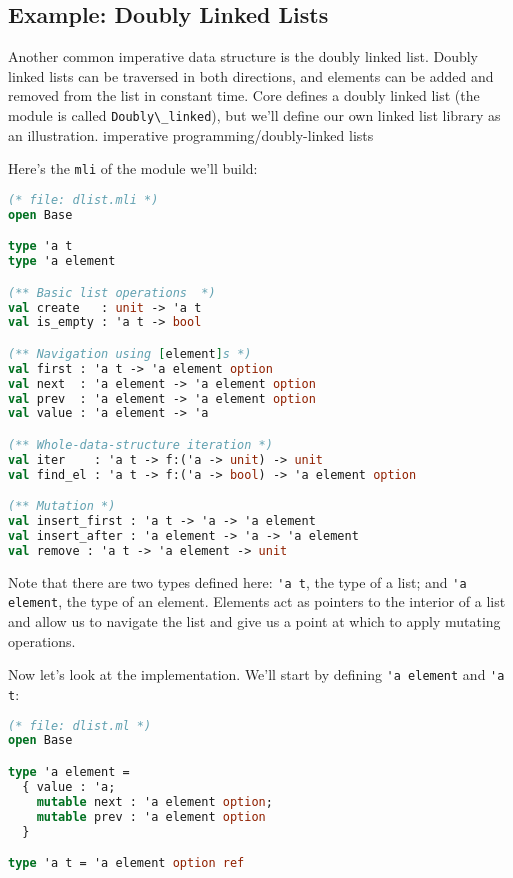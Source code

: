 \hypertarget{example-doubly-linked-lists}{%
\subsection{Example: Doubly Linked
Lists}\label{example-doubly-linked-lists}}

Another common imperative data structure is the doubly linked list.
Doubly linked lists can be traversed in both directions, and elements
can be added and removed from the list in constant time. Core defines a
doubly linked list (the module is called
\passthrough{\lstinline!Doubly\_linked!}), but we'll define our own
linked list library as an illustration.
\protect\hypertarget{IPdoublink}{}{imperative
programming/doubly-linked lists}

Here's the \passthrough{\lstinline!mli!} of the module we'll build:

\begin{lstlisting}[language=Caml]
(* file: dlist.mli *)
open Base

type 'a t
type 'a element

(** Basic list operations  *)
val create   : unit -> 'a t
val is_empty : 'a t -> bool

(** Navigation using [element]s *)
val first : 'a t -> 'a element option
val next  : 'a element -> 'a element option
val prev  : 'a element -> 'a element option
val value : 'a element -> 'a

(** Whole-data-structure iteration *)
val iter    : 'a t -> f:('a -> unit) -> unit
val find_el : 'a t -> f:('a -> bool) -> 'a element option

(** Mutation *)
val insert_first : 'a t -> 'a -> 'a element
val insert_after : 'a element -> 'a -> 'a element
val remove : 'a t -> 'a element -> unit
\end{lstlisting}

Note that there are two types defined here:
\passthrough{\lstinline!'a t!}, the type of a list; and
\passthrough{\lstinline!'a element!}, the type of an element. Elements
act as pointers to the interior of a list and allow us to navigate the
list and give us a point at which to apply mutating operations.

Now let's look at the implementation. We'll start by defining
\passthrough{\lstinline!'a element!} and \passthrough{\lstinline!'a t!}:

\begin{lstlisting}[language=Caml]
(* file: dlist.ml *)
open Base

type 'a element =
  { value : 'a;
    mutable next : 'a element option;
    mutable prev : 'a element option
  }

type 'a t = 'a element option ref
\end{lstlisting}

